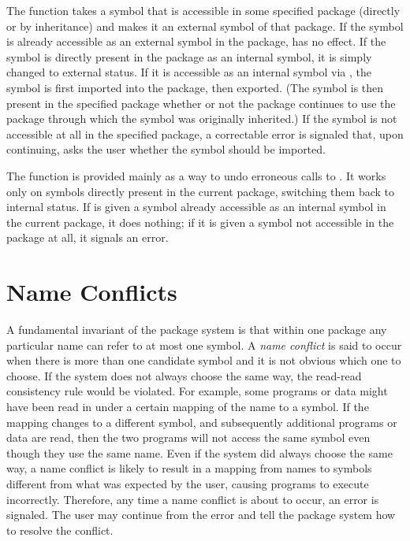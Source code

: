 The function  takes a symbol that is accessible in some
specified package (directly or by inheritance) and makes it an external
symbol of that package.  If the symbol is already accessible as an
external symbol in the package,  has no effect.  If the symbol
is directly present in the package as an internal symbol, it is simply
changed to external status.  If it is accessible as an internal symbol
via , the symbol is first imported into the package, then
exported.  (The symbol is then present in the specified package
whether or not the package
continues to use the package through which the symbol was originally
inherited.)  If the symbol is not
accessible at all in the specified package, a correctable error is
signaled that, upon continuing, asks the user whether the symbol
should be imported.

The function  is provided mainly as a way to undo erroneous
calls to .  It works only on symbols directly present
in the current package, switching them back to internal status.  If
 is given a symbol already accessible as an internal
symbol in the current package, it does nothing; if it is given a symbol
not accessible in the package at all, it signals an error.

\section{Name Conflicts}
\label{NAME-CONFLICTS-SECTION}

A fundamental invariant of the package system is that within one package
any particular name can refer to at most one symbol.  A \emph{name conflict}
is said to occur when there is more than one candidate symbol and it is
not obvious which one to choose.  If the system does not always choose
the same way, the read-read consistency rule would be violated.  For
example, some programs or data might have been read in under a certain
mapping of the name to a symbol.  If the mapping changes to a different
symbol, and subsequently additional programs or data are read,
then the two programs will
not access the same symbol even though they use the same name.  Even if
the system did always choose the same way, a name conflict is likely to
result in a mapping from names to symbols different from what was expected by
the user, causing programs to execute incorrectly.  Therefore, any time
a name conflict is about to occur,
an error is signaled.  The user may continue
from the error and tell the package system how to resolve the conflict.

